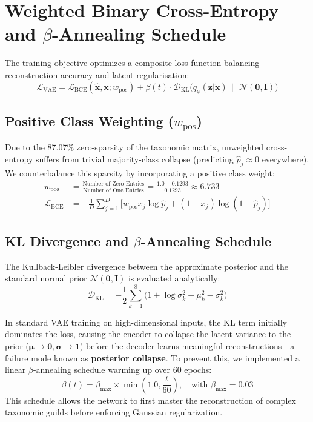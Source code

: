 \section{Weighted Binary Cross-Entropy and $\beta$-Annealing Schedule}
The training objective optimizes a composite loss function balancing reconstruction accuracy and latent regularisation:
\begin{equation}
    \mathcal{L}_{\text{VAE}} = \mathcal{L}_{\text{BCE}}(\hat{\mathbf{x}}, \mathbf{x}; w_{\text{pos}}) + \beta(t) \cdot \mathcal{D}_{\text{KL}}\big(q_\phi(\mathbf{z}|\tilde{\mathbf{x}}) \,\|\, \mathcal{N}(\mathbf{0}, \mathbf{I})\big)
\end{equation}

\subsection{Positive Class Weighting ($w_{\text{pos}}$)}
Due to the 87.07\% zero-sparsity of the taxonomic matrix, unweighted cross-entropy suffers from trivial majority-class collapse (predicting $\hat{p}_j \approx 0$ everywhere). We counterbalance this sparsity by incorporating a positive class weight:
\begin{align}
    w_{\text{pos}} &= \frac{\text{Number of Zero Entries}}{\text{Number of One Entries}} = \frac{1.0 - 0.1293}{0.1293} \approx 6.733 \\
    \mathcal{L}_{\text{BCE}} &= -\frac{1}{D} \sum_{j=1}^{D} \Big[ w_{\text{pos}} x_j \log \hat{p}_j + (1 - x_j) \log(1 - \hat{p}_j) \Big]
\end{align}

\subsection{KL Divergence and $\beta$-Annealing Schedule}
The Kullback-Leibler divergence between the approximate posterior and the standard normal prior $\mathcal{N}(\mathbf{0}, \mathbf{I})$ is evaluated analytically:
\begin{equation}
    \mathcal{D}_{\text{KL}} = -\frac{1}{2} \sum_{k=1}^{8} \Big(1 + \log \sigma_k^2 - \mu_k^2 - \sigma_k^2\Big)
\end{equation}

In standard VAE training on high-dimensional inputs, the KL term initially dominates the loss, causing the encoder to collapse the latent variance to the prior ($\boldsymbol{\mu} \rightarrow \mathbf{0}, \boldsymbol{\sigma} \rightarrow \mathbf{1}$) before the decoder learns meaningful reconstructions—a failure mode known as \textbf{posterior collapse}. To prevent this, we implemented a linear $\beta$-annealing schedule warming up over 60 epochs:
\begin{equation}
    \beta(t) = \beta_{\max} \times \min\left(1.0, \frac{t}{60}\right), \quad \text{with } \beta_{\max} = 0.03
\end{equation}
This schedule allows the network to first master the reconstruction of complex taxonomic guilds before enforcing Gaussian regularization.

